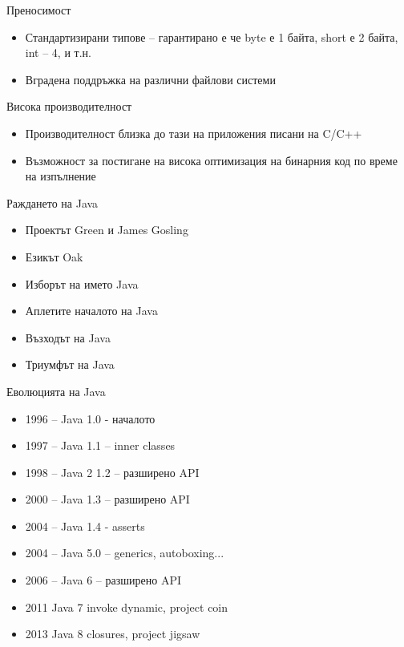 \documentclass{beamer}
\begin{document}
\begin{frame}{Преносимост}
  \begin{itemize}
  \item Стандартизирани типове – гарантирано
  е че byte е 1 байта, short е 2 байта, int –
  4, и т.н.
  \item Вградена поддръжка на различни
  файлови системи
  \end{itemize}

\end{frame}


\begin{frame}{Висока производителност}
  \begin{itemize}
  \item Производителност близка до тази на
  приложения писани на C/C++
  \item Възможност за постигане на висока
  оптимизация на бинарния код по време
  на изпълнение
\end{itemize}

\end{frame}

\begin{frame}{Раждането на Java}
  \begin{itemize}
    \item Проектът Green и James Gosling
    \item Езикът Oak
    \item Изборът на името Java
    \item Аплетите началото на Java
    \item Възходът на Java
    \item Триумфът на Java
  \end{itemize}
\end{frame}

\begin{frame}{Еволюцията на Java}
  \begin{itemize}
  \item 1996 – Java 1.0 - началото
  \item 1997 – Java 1.1 – inner classes
  \item 1998 – Java 2 1.2 – разширено API
  \item 2000 – Java 1.3 – разширено API
  \item 2004 – Java 1.4 - asserts
  \item 2004 – Java 5.0 – generics, autoboxing...
  \item 2006 – Java 6 – разширено API
  \item 2011   Java 7 invoke dynamic, project coin
  \item 2013   Java 8 closures, project jigsaw
  \end{itemize}
\end{frame}
\end{document}

